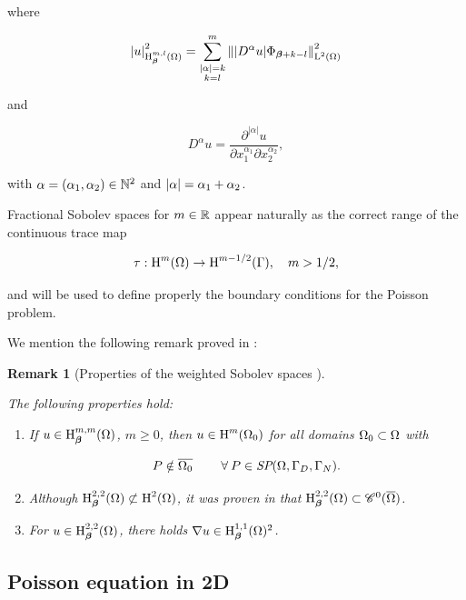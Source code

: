 \documentclass[a4paper,11pt]{article}
\newtheorem{remark}[theorem]{Remark}
\begin{document}
{where

$$\left|u\right|^{2}_{\operatorname H^{m,l}_{\boldsymbol \beta}(\Omega)} = \sum_{\substack{|\alpha| = k \\ k=l}}^{m} \left\||D^{\alpha}u| \Phi_{\boldsymbol \beta + k - l}\right\|^{2}_{\operatorname L^{2}(\Omega)}$$

and

$$D^{\alpha}u = \frac{\partial^{|\alpha|} u}{\partial x_{1}^{\alpha_{1}} \partial x_{2}^{\alpha_{2}}},$$


with $\alpha = (\alpha_{1},\alpha_{2}) \in \mathbb N^{2}$ and $\left|\alpha\right| = \alpha_{1} + \alpha_{2}$. 

Fractional Sobolev spaces for $m \in \mathbb R$  appear naturally as the correct range of the continuous trace map

$$ \tau: \operatorname H^{m}(\Omega) \rightarrow \operatorname H^{m - 1/2}(\Gamma), \quad m > 1/2, $$

and will be used to define properly the boundary conditions for the Poisson problem.

We mention the following remark proved in \cite{Wihler:2003}:

\begin{remark}[Properties of the weighted Sobolev spaces {\cite[Remark 1.2.2]{Wihler:2003}}]
\label{remark:properties_sob_spaces}

The following properties hold:

\begin{enumerate}

    \item  If  $u \in \operatorname H^{m,m}_{\boldsymbol \beta}(\Omega)$, $m\geq0$, then $u \in \operatorname H^{m}(\Omega_{0})$ for all domains $\Omega_{0} \subset \Omega$ with
    
    $$ P \notin \overline{\Omega_{0}} \quad  \quad\:\forall\: P \in  \textit{SP}(\Omega,\Gamma_{D},\Gamma_{N}).$$
    
    \item Although $\operatorname H^{2,2}_{\boldsymbol \beta}(\Omega) \not \subset \operatorname H^{2}(\Omega)$, it was proven in \cite{BKP:1979} that $\operatorname H^{2,2}_{\boldsymbol \beta}(\Omega) \subset \mathscr C^{0}(\overline{\Omega})$.
    
    \item For $u \in \operatorname H^{2,2}_{\boldsymbol \beta}(\Omega)$, there holds $\nabla u \in \operatorname H^{1,1}_{\boldsymbol \beta}(\Omega)^{2}$.

\end{enumerate}
    
\end{remark}


\subsection{Poisson equation in 2D}

}
\end{document}

